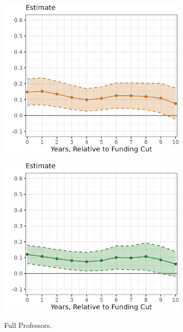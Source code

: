 \begin{figure}[h!]
\begin{subfigure}[b]{0.495\textwidth}
        \includegraphics[width=\textwidth]{figures/assistant-count-lp.png}
        \label{fig:assistant-count-lp}
    \end{subfigure}
    \begin{subfigure}[b]{0.495\textwidth}
        \centering
        \caption{Full Professors.}
        \includegraphics[width=\textwidth]{figures/full-count-lp.png}
        \label{fig:full-count-lp}
    \end{subfigure}
    \begin{subfigure}[b]{0.495\textwidth}

\end{subfigure}
\end{figure}
